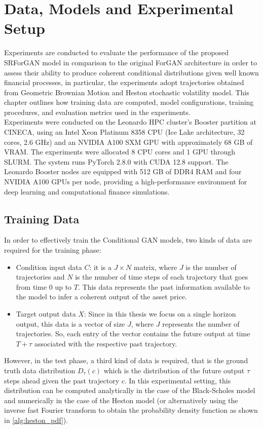 \chapter{Data, Models and Experimental Setup}
\label{setup}
Experiments are conducted to evaluate the performance of the proposed SRForGAN model in comparison to the original ForGAN architecture in order to assess their ability to produce coherent conditional distributions given well known financial processes, 
in particular, the experiments adopt trajectories obtained from Geometric Brownian Motion and Heston stochastic volatility model. 
This chapter outlines how training data are computed, model configurations, training procedures, and evaluation metrics used in the experiments.\\

Experiments were conducted on the Leonardo HPC cluster's 
Booster partition at CINECA, using an Intel Xeon Platinum 
8358 CPU (Ice Lake architecture, 32 cores, 2.6 GHz) and an 
NVIDIA A100 SXM GPU with approximately 68 GB of VRAM. 
The experiments were allocated 8 CPU cores and 1 GPU 
through SLURM. The system runs PyTorch 2.8.0 with CUDA 12.8 
support. 
The Leonardo Booster nodes are equipped with 512 GB of DDR4 RAM and four NVIDIA A100 GPUs per node, 
providing a high-performance environment for deep learning and 
computational finance simulations.

\section{Training Data}
In order to effectively train the Conditional GAN models, two kinds of data are required for the training phase:
\begin{itemize}
    \item Condition input data $C$: it is a $J \times N$ matrix, where $J$ is the number of trajectories and $N$ is the number of time steps of each trajectory that goes from time 0 up to $T$.
     This data represents the past information available to the model to infer a coherent output of the asset price.
     \item Target output data $X$: Since in this thesis we focus on a single horizon output, this data is a vector of size $J$, where $J$ represents the number of trajectories.
    So, each entry of the vector contains the future output at time $T + \tau$ associated with the respective past trajectory. 
    \end{itemize}

However, in the test phase, a third kind of data is required, that is the ground truth data distribution $D_\tau(c)$ which is the 
distribution of the future output $\tau$ steps ahead given the past trajectory $c$. In this experimental setting, this distribution can be 
computed analytically in the case of the Black-Scholes model and 
numerically in the case of the Heston model (or alternatively using the inverse fast Fourier transform to obtain the probability density function as shown in \ref{alg:heston_pdf}).\\


